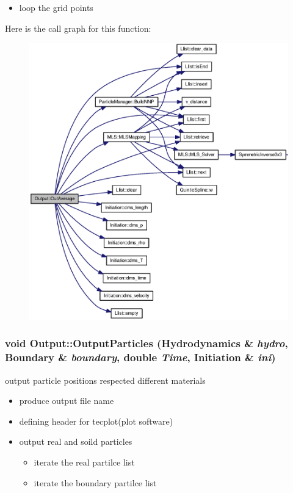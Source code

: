 \begin{itemize}
\item loop the grid points \end{itemize}


Here is the call graph for this function:\nopagebreak
\begin{figure}[H]
\begin{center}
\leavevmode
\includegraphics[width=333pt]{classOutput_13b9be49d851806b4ab40d60624095ad_cgraph}
\end{center}
\end{figure}
\hypertarget{classOutput_f9e8b1a0aa456c01c69f7b3c7ee2649a}{
\subsubsection[{OutputParticles}]{\setlength{\rightskip}{0pt plus 5cm}void Output::OutputParticles ({\bf Hydrodynamics} \& {\em hydro}, \/  {\bf Boundary} \& {\em boundary}, \/  double {\em Time}, \/  {\bf Initiation} \& {\em ini})}}
\label{classOutput_f9e8b1a0aa456c01c69f7b3c7ee2649a}


output particle positions respected different materials 



\begin{itemize}
\item produce output file name

\item defining header for tecplot(plot software)

\item output real and soild particles

\begin{itemize}
\item iterate the real partilce list

\item iterate the boundary partilce list \end{itemize}
\end{itemize}


